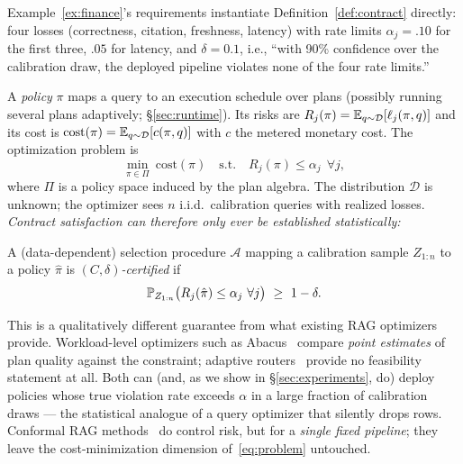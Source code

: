 Example~\ref{ex:finance}'s requirements instantiate
Definition~\ref{def:contract} directly: four losses (correctness,
citation, freshness, latency) with rate limits $\alpha_j = .10$ for
the first three, $.05$ for latency, and $\delta = 0.1$, i.e., ``with
90\% confidence over the calibration draw, the deployed pipeline
violates none of the four rate limits.''

A \emph{policy} $\pi$ maps a query to an execution schedule over plans
(possibly running several plans adaptively; \S\ref{sec:runtime}). Its risks
are $R_j(\pi) = \mathbb{E}_{q\sim\mathcal{D}}[\ell_j(\pi, q)]$ and its cost is
$\mathrm{cost}(\pi) = \mathbb{E}_{q\sim\mathcal{D}}[c(\pi, q)]$ with $c$ the metered
monetary cost. The optimization problem is
\begin{equation}
\label{eq:problem}
\min_{\pi \in \Pi} \ \mathrm{cost}(\pi)
\quad \text{s.t.} \quad R_j(\pi) \le \alpha_j \ \ \forall j ,
\end{equation}
where $\Pi$ is a policy space induced by the plan algebra. The
distribution $\mathcal{D}$ is unknown; the optimizer sees $n$ i.i.d.\
calibration queries with realized losses. \emph{Contract satisfaction can
therefore only ever be established statistically:}

\begin{definition}
\label{def:certified}
A (data-dependent) selection procedure $\mathcal{A}$ mapping a calibration
sample $Z_{1:n}$ to a policy $\hat\pi$ is \emph{$(C,\delta)$-certified} if
\[
\mathbb{P}_{Z_{1:n}}\big( R_j(\hat\pi) \le \alpha_j \ \forall j \big) \ \ge\ 1-\delta .
\]
\end{definition}

This is a qualitatively different guarantee from what existing RAG
optimizers provide. Workload-level optimizers such as
Abacus~\cite{russo2025abacus} compare \emph{point estimates} of plan quality
against the constraint; adaptive routers~\cite{jeong2024adaptiverag}
provide no feasibility statement at all. Both can (and, as we show in
\S\ref{sec:experiments}, do) deploy policies whose true violation rate
exceeds $\alpha$ in a large fraction of calibration draws --- the
statistical analogue of a query optimizer that silently drops rows.
Conformal RAG methods~\cite{li2024traq,kang2024crag} do control risk, but
for a \emph{single fixed pipeline}; they leave the cost-minimization
dimension of~\eqref{eq:problem} untouched.

